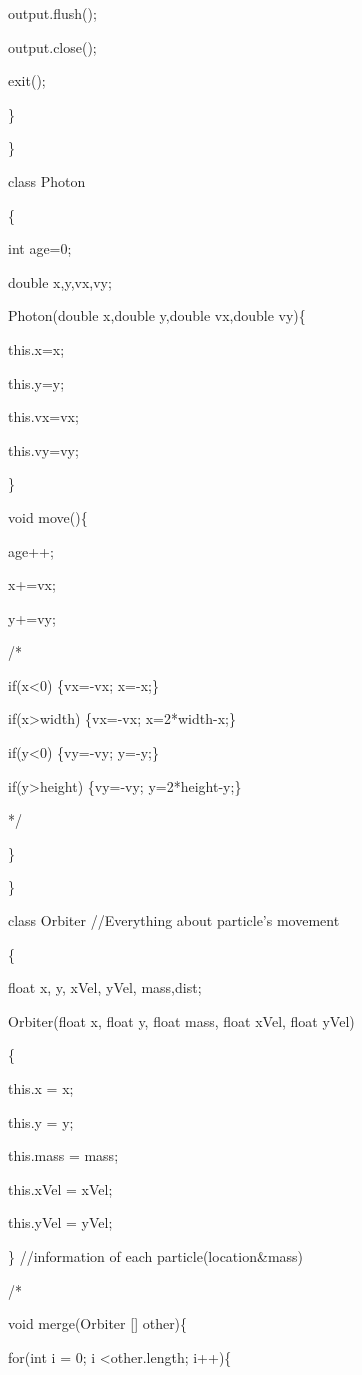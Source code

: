 \documentclass{gshs-hutech}
\begin{document}
\begin{tiny}
output.flush();

output.close();

exit();

\}

\}

class Photon

\{

int age=0;

double x,y,vx,vy;

Photon(double x,double y,double vx,double vy)\{

this.x=x;

this.y=y;

this.vx=vx;

this.vy=vy;

\}

void move()\{

age++;

x+=vx;

y+=vy;

/*

if(x\textless0) \{vx=-vx; x=-x;\}

if(x\textgreater width) \{vx=-vx; x=2*width-x;\}

if(y\textless0) \{vy=-vy; y=-y;\}

if(y\textgreater height) \{vy=-vy; y=2*height-y;\}

*/

\}

\}

class Orbiter                                                                                              //Everything about particle's movement

\{

float x, y, xVel, yVel, mass,dist;

Orbiter(float x, float y, float mass, float xVel, float yVel)

\{

this.x = x;

this.y = y;

this.mass = mass;

this.xVel = xVel;

this.yVel = yVel;


\}                                                                                                    //information of each particle(location\&mass)

/*

void merge(Orbiter [] other)\{

for(int i = 0; i \textless other.length; i++)\{


\end{tiny}
\end{document}
